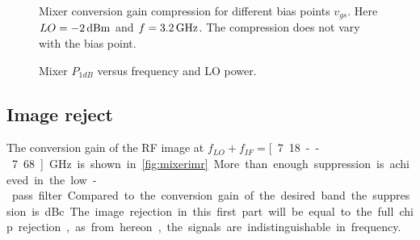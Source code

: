 			\begin{figure}[hbt!]
				\centering
				\caption[Mixer conversion gain compression.]{Mixer conversion gain compression for different bias points $v_{gs}$. Here $LO=\unit[-2]{dBm}$ and $f=\unit[3.2]{GHz}$. The compression does not vary with the bias point.}\label{fig:mixerp1dbvsbias}
			\end{figure}

			\begin{figure}[hpt!]
				\centering
				\caption[Mixer $P_{1dB}$.]{Mixer $P_{1dB}$ versus frequency and LO power.}\label{fig:mixerp1db}
			\end{figure}

		\subsection{Image reject}
			The conversion gain of the RF image at $f_{LO}+f_{IF}=$\unit[7.18--7.68]{GHz} is shown in \autoref{fig:mixerimr}. More than enough suppression is achieved in the low-pass filter. Compared to the conversion gain of the desired band the suppression is \unit[40]{dBc}. The image rejection in this first part will be equal to the full chip rejection, as from hereon, the signals are indistinguishable in frequency.

